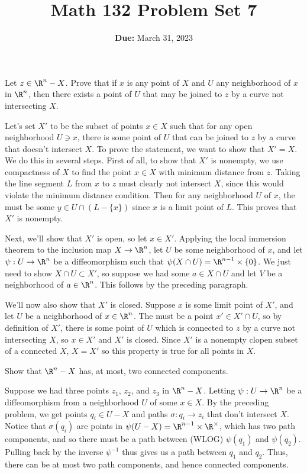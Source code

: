 \documentclass[11pt,letterpaper]{article}
\title{\textbf{Math 132 Problem Set 7}}
\date{\textbf{Due:} March 31, 2023}
\begin{document}
\maketitle

\begin{problem}
{Let $z \in \R^n - X$. Prove that if $x$ is any point of $X$ and $U$ any neighborhood of $x$ in $\R^n$, then there exists a point of $U$ that may be joined to $z$ by a curve not intersecting $X$.}
\end{problem}

\begin{solution}
    \quad Let's set $X'$ to be the subset of points $x\in X$ such that for any open neighborhood $U\ni x$, there is some point of $U$ that can be joined to $z$ by a curve that doesn't intersect $X$. To prove the statement, we want to show that $X' = X$. We do this in several steps. First of all, to show that $X'$ is nonempty, we use compactness of $X$ to find the point $x\in X$ with minimum distance from $z$. Taking the line segment $L$ from $x$ to $z$ must clearly not intersect $X$, since this would violate the minimum distance condition. Then for any neighborhood $U$ of $x$, the must be some $y \in U\cap (L-\{x\})$ since $x$ is a limit point of $L$. This proves that $X'$ is nonempty.

    \quad Next, we'll show that $X'$ is open, so let $x\in X'$. Applying the local immersion theorem to the inclusion map $X \to \R^n$, let $U$ be some neighborhood of $x$, and let $\psi : U \to \R^n$ be a diffeomorphism such that $\psi(X\cap U) = \R^{n-1}\times \{0\}$. We just need to show $X \cap U\subset X'$, so suppose we had some $a\in X\cap U$ and let $V$ be a neighborhood of $a\in \R^n$. This follows by the preceding paragraph.

    \quad We'll now also show that $X'$ is closed. Suppose $x$ is some limit point of $X'$, and let $U$ be a neighborhood of $x\in \R^n$. The must be a point $x'\in X'\cap U$, so by definition of $X'$, there is some point of $U$ which is connected to $z$ by a curve not intersecting $X$, so $x\in X'$ and $X'$ is closed. Since $X'$ is a nonempty clopen subset of a connected $X$, $X=X'$ so this property is true for all points in $X$.
\end{solution}

\begin{problem}
    {Show that $\R^n-X$ has, at most, two connected components.}
\end{problem}

\begin{solution}
    \quad Suppose we had three points $z_1$, $z_2$, and $z_3$ in $\R^n - X$. Letting $\psi : U \to \R^n$ be a diffeomorphism from a neighborhood $U$ of some $x\in X$. By the preceding problem, we get points $q_i\in U-X$ and paths $\sigma : q_i \to z_i$ that don't intersect $X$. Notice that $\sigma(q_i)$ are points in $\psi(U-X)=\R^{n-1}\times \R^\times$, which has two path components, and so there must be a path between (WLOG) $\psi(q_1)$ and $\psi(q_2)$. Pulling back by the inverse $\psi^{-1}$ thus gives us a path between $q_1$ and $q_2$. Thus, there can be at most two path components, and hence connected components.
\end{solution}
    
\end{document}
